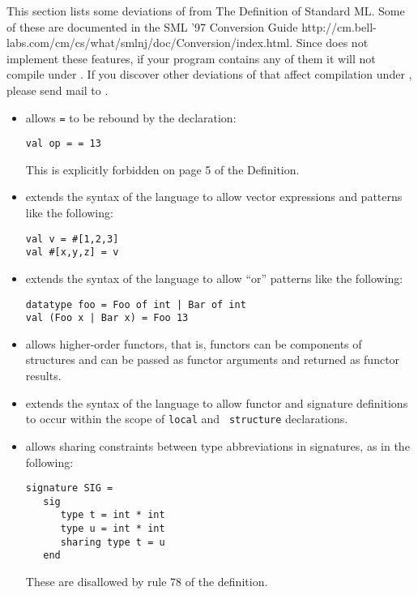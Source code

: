 
This section lists some deviations of {\smlnj} from The Definition of
Standard ML.  Some of these are documented in the 
\htmladdnormallink
  {SML '97 Conversion Guide}
  {http://cm.bell-labs.com/cm/cs/what/smlnj/doc/Conversion/index.html}.
Since {\mlton} does not implement these features, if your program
contains any of them it will not compile under {\mlton}.  If you discover
other deviations of {\smlnj} that affect compilation under {\mlton},
please send mail to {\mltonmail}.

\begin{itemize}
\item
{\smlnj} allows {\tt =} to be rebound by the declaration:
\begin{verbatim}
val op = = 13
\end{verbatim}
This is explicitly forbidden on page 5 of the Definition.

\item
{\smlnj} extends the syntax of the language to allow
vector expressions and patterns like the following:
\begin{verbatim}
val v = #[1,2,3]
val #[x,y,z] = v
\end{verbatim}

\item 
{\smlnj} extends the syntax of the language to allow ``or'' patterns
like the following:
\begin{verbatim}
datatype foo = Foo of int | Bar of int
val (Foo x | Bar x) = Foo 13
\end{verbatim}

\item
{\smlnj} allows higher-order functors, that is, functors can be
components of structures and can be passed as functor arguments and
returned as functor results. 

\item
{\smlnj} extends the syntax of the language to allow functor and
signature definitions to occur within the scope of {\tt local} and {\tt
structure} declarations.

\item
{\smlnj} allows sharing constraints between type abbreviations in
signatures, as in the following:
\begin{verbatim}
signature SIG =
   sig
      type t = int * int
      type u = int * int
      sharing type t = u
   end
\end{verbatim}
These are disallowed by rule 78 of the definition.


\end{itemize}
